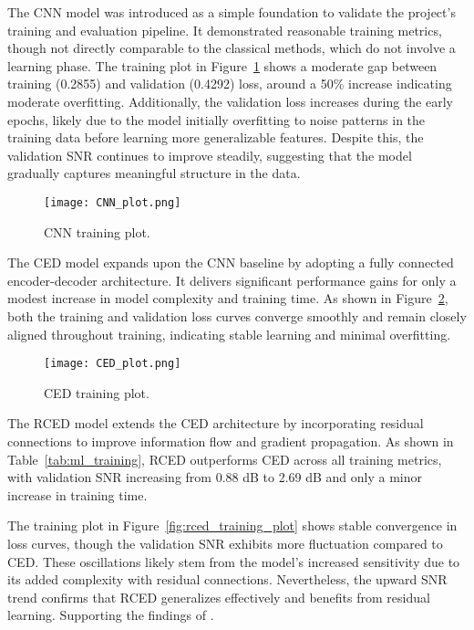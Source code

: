 The CNN model was introduced as a simple foundation to validate the project’s training and evaluation pipeline. It demonstrated reasonable training metrics, though not directly comparable to the classical methods, which do not involve a learning phase. The training plot in Figure~\ref{fig:cnn_training_plot} shows a moderate gap between training (0.2855) and validation (0.4292) loss, around a 50\% increase indicating moderate overfitting. Additionally, the validation loss increases during the early epochs, likely due to the model initially overfitting to noise patterns in the training data before learning more generalizable features. Despite this, the validation SNR continues to improve steadily, suggesting that the model gradually captures meaningful structure in the data.

\begin{figure}[H]
    \centering
    \texttt{[image: CNN\_plot.png]}
    \caption{\label{fig:cnn_training_plot} CNN training plot.}
\end{figure}

The CED model expands upon the CNN baseline by adopting a fully connected encoder-decoder architecture. It delivers significant performance gains for only a modest increase in model complexity and training time. As shown in Figure~\ref{fig:ced_training_plot}, both the training and validation loss curves converge smoothly and remain closely aligned throughout training, indicating stable learning and minimal overfitting.

\begin{figure}[H]
    \centering
    \texttt{[image: CED\_plot.png]}
    \caption{\label{fig:ced_training_plot} CED training plot.}
\end{figure}

The RCED model extends the CED architecture by incorporating residual connections to improve information flow and gradient propagation. As shown in Table~\ref{tab:ml_training}, RCED outperforms CED across all training metrics, with validation SNR increasing from 0.88 dB to 2.69 dB and only a minor increase in training time.

The training plot in Figure~\ref{fig:rced_training_plot} shows stable convergence in loss curves, though the validation SNR exhibits more fluctuation compared to CED. These oscillations likely stem from the model’s increased sensitivity due to its added complexity with residual connections. Nevertheless, the upward SNR trend confirms that RCED generalizes effectively and benefits from residual learning. Supporting the findings of \cite{park2017acoustic}.

